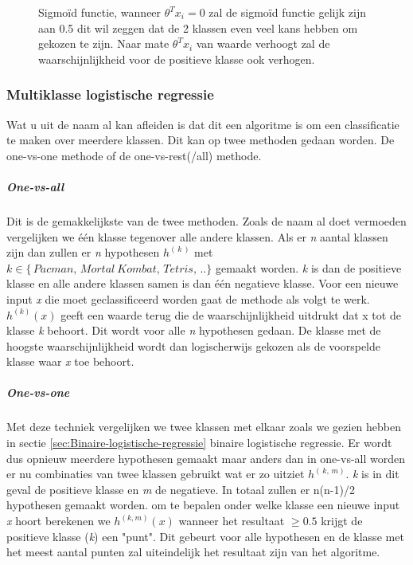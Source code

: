 \begin{figure}
	\centering
	\caption{Sigmoïd functie, wanneer  $\theta^{T}x_{i} = 0$ zal de sigmoïd functie gelijk zijn aan 0.5 dit wil zeggen dat de 2 klassen even veel kans hebben om gekozen te zijn. Naar mate  $\theta^{T}x_{i}$ van waarde verhoogt zal de waarschijnlijkheid voor de positieve klasse ook verhogen. }
	\label{fig:sigmoid-functie}
\end{figure}
 

\subsubsection{Multiklasse logistische regressie}
\label{sec:Multiklasse-logistische-regressie}
Wat u uit de naam al kan afleiden is dat dit een algoritme is om een classificatie te maken over meerdere klassen. Dit kan op twee methoden gedaan worden. De one-vs-one methode of de one-vs-rest(/all) methode. 
\subparagraph{One-vs-all}
Dit is de gemakkelijkste van de twee methoden. Zoals de naam al doet vermoeden vergelijken we één klasse tegenover alle andere klassen. Als er \textit{n} aantal klassen zijn dan zullen er \textit{n} hypothesen $h^{(\,k\,)}$ met $k \in \{\,Pacman, \, Mortal \:Kombat, \, Tetris, \,..\}$ gemaakt worden. \textit{k} is dan de positieve klasse en alle andere klassen samen is dan één negatieve klasse. \newline
Voor een nieuwe input \textit{x} die moet geclassificeerd worden gaat de methode als volgt te werk. $h^{(k)} (x)$ geeft een waarde terug die de waarschijnlijkheid uitdrukt dat x tot de klasse \textit{k} behoort. Dit wordt voor alle \textit{n} hypothesen gedaan. De klasse met de hoogste waarschijnlijkheid wordt dan logischerwijs gekozen als de voorspelde klasse waar \textit{x} toe behoort. 
\subparagraph{One-vs-one}
Met deze techniek vergelijken we twee klassen met elkaar zoals we gezien hebben in sectie \ref{sec:Binaire-logistische-regressie} binaire logistische regressie. Er wordt dus opnieuw meerdere hypothesen gemaakt maar anders dan in one-vs-all worden er nu combinaties van twee klassen gebruikt wat er zo uitziet $h^{(\,k,\,m)}$. \textit{k} is in dit geval de positieve klasse en \textit{m} de negatieve. In totaal zullen er n(n-1)/2 hypothesen gemaakt worden.
om te bepalen onder welke klasse een nieuwe input \textit{x} hoort berekenen we $h^{(k,m)}(x)$ wanneer het resultaat $\geq 0.5$ krijgt de positieve klasse (\textit{k}) een "punt". Dit gebeurt voor alle hypothesen en de klasse met het meest aantal punten zal uiteindelijk het resultaat zijn van het algoritme. 

